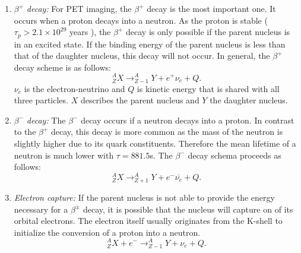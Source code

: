 \begin{enumerate}
\item $\beta^+$ \textit{decay: }For PET imaging, the $\beta^+$ decay is the most important one. It occurs when a proton decays into a neutron. As the proton is stable ($\tau_p > 2.1 \times 10^{29}$ years \cite{PDG}), the $\beta^+$ decay is only possible if the parent nucleus is in an excited state. If the binding energy of the parent nucleus is less than that of the daughter nucleus, this decay will not occur. In general, the $\beta^+$ decay scheme is as follows:
\begin{equation}
^A_ZX\rightarrow ^A_{Z-1}Y + e^+ \nu_e + Q.
\end{equation}
$\nu_e$ is the electron-neutrino and $Q$ is kinetic energy that is shared with all three particles. $X$ describes the parent nucleus and $Y$ the daughter nucleus.
\item $\beta^-$ \textit{decay: }The $\beta^-$ decay occurs if a neutron decays into a proton. In contrast to the $\beta^+$ decay, this decay is more common as the mass of the neutron is slightly higher due to its quark constituents. Therefore the mean lifetime of a neutron is much lower with $\tau = 881.5$s\cite{PDG}. The $\beta^-$ decay schema proceeds as follows:
\begin{equation}
^A_ZX\rightarrow ^A_{Z+1}Y + e^- \overline{\nu_e} + Q.
\end{equation}
\item \textit{Electron capture: }If the parent nucleus is not able to provide the energy necessary for a $\beta^\pm$ decay, it is possible that the nucleus will capture on of its orbital electrons. The electron itself usually originates from the K-shell to initialize the conversion of a proton into a neutron.
\begin{equation}
^A_ZX + e^-\rightarrow ^A_{Z-1}Y + \nu_e + Q.
\end{equation}
\end{enumerate}
